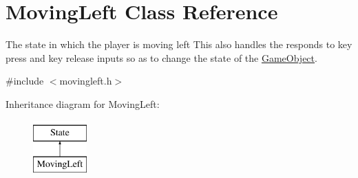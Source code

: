 \hypertarget{classMovingLeft}{\section{Moving\-Left Class Reference}
\label{classMovingLeft}
}


The state in which the player is moving left This also handles the responds to key press and key release inputs so as to change the state of the \hyperlink{classGameObject}{Game\-Object}.  




{\ttfamily \#include $<$movingleft.\-h$>$}

Inheritance diagram for Moving\-Left\-:\begin{figure}[H]
\begin{center}
\leavevmode
\includegraphics[height=2.000000cm]{classMovingLeft}
\end{center}
\end{figure}
